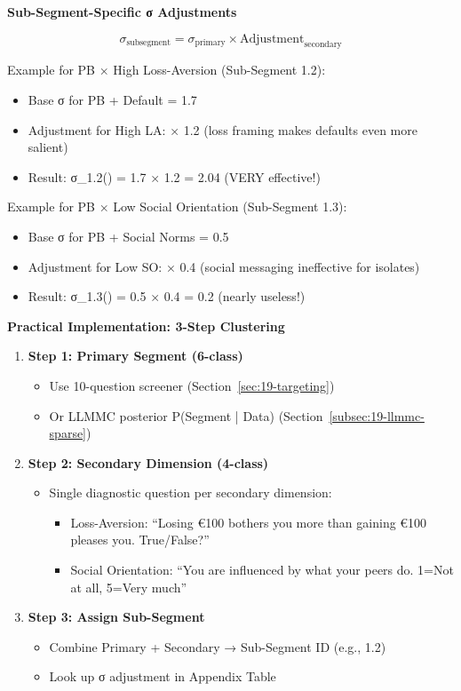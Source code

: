 \textbf{Sub-Segment-Specific σ Adjustments}

\begin{equation}
\sigma_{\text{subsegment}} = \sigma_{\text{primary}} \times \text{Adjustment}_{\text{secondary}}
\end{equation}

Example for PB × High Loss-Aversion (Sub-Segment 1.2):

\begin{itemize}[nosep]
\item Base σ for PB + Default = 1.7
\item Adjustment for High LA: × 1.2 (loss framing makes defaults even more salient)
\item Result: σ_{1.2}() = 1.7 × 1.2 = 2.04 (VERY effective!)
\end{itemize}

Example for PB × Low Social Orientation (Sub-Segment 1.3):

\begin{itemize}[nosep]
\item Base σ for PB + Social Norms = 0.5
\item Adjustment for Low SO: × 0.4 (social messaging ineffective for isolates)
\item Result: σ_{1.3}() = 0.5 × 0.4 = 0.2 (nearly useless!)
\end{itemize}

\textbf{Practical Implementation: 3-Step Clustering}

\begin{enumerate}
\item \textbf{Step 1: Primary Segment (6-class)}
  \begin{itemize}[nosep]
  \item Use 10-question screener (Section~\ref{sec:19-targeting})
  \item Or LLMMC posterior P(Segment | Data) (Section~\ref{subsec:19-llmmc-sparse})
  \end{itemize}

\item \textbf{Step 2: Secondary Dimension (4-class)}
  \begin{itemize}[nosep]
  \item Single diagnostic question per secondary dimension:
    \begin{itemize}[nosep]
    \item Loss-Aversion: ``Losing €100 bothers you more than gaining €100 pleases you. True/False?''
    \item Social Orientation: ``You are influenced by what your peers do. 1=Not at all, 5=Very much''
    \end{itemize}
  \end{itemize}

\item \textbf{Step 3: Assign Sub-Segment}
  \begin{itemize}[nosep]
  \item Combine Primary + Secondary → Sub-Segment ID (e.g., 1.2)
  \item Look up σ adjustment in Appendix Table
  \end{itemize}
\end{enumerate}

